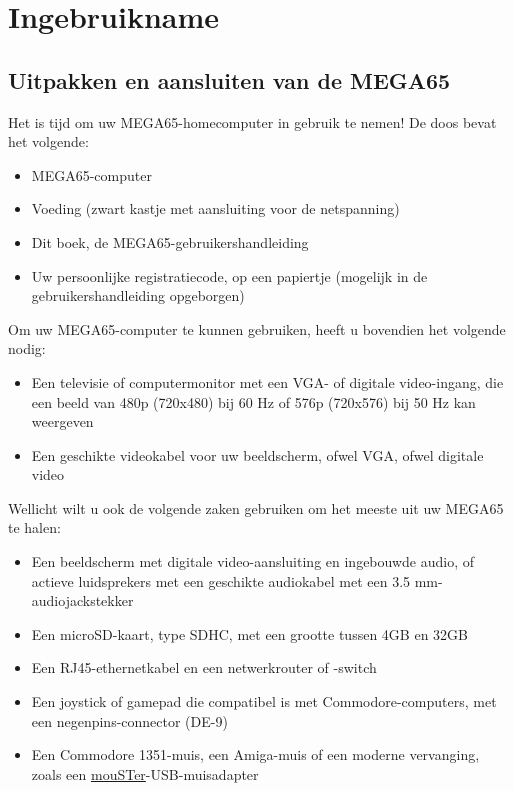 \chapter{Ingebruikname}

\section{Uitpakken en aansluiten van de MEGA65}
\label{cha:setup}

Het is tijd om uw MEGA65-homecomputer in gebruik te nemen! De doos bevat het volgende:

\begin{itemize}
\setlength\itemsep{-0.75mm}
	\item MEGA65-computer	\item Voeding (zwart kastje met aansluiting voor de netspanning)	\item Dit boek, de MEGA65-gebruikershandleiding	\item Uw persoonlijke registratiecode, op een papiertje (mogelijk in de gebruikershandleiding opgeborgen)
\end{itemize}

Om uw MEGA65-computer te kunnen gebruiken, heeft u bovendien het volgende nodig:

\begin{itemize}
	\item Een televisie of computermonitor met een VGA- of digitale video-ingang, die een beeld van 480p (720x480) bij 60 Hz of 576p (720x576) bij 50 Hz kan weergeven	\item Een geschikte videokabel voor uw beeldscherm, ofwel VGA, ofwel digitale video
\end{itemize}

Wellicht wilt u ook de volgende zaken gebruiken om het meeste uit uw MEGA65 te halen:

\begin{itemize}
	\item Een beeldscherm met digitale video-aansluiting en ingebouwde audio, of actieve luidsprekers met een geschikte audiokabel met een 3.5 mm-audiojackstekker	\item Een microSD-kaart, type SDHC, met een grootte tussen 4GB en 32GB	\item Een RJ45-ethernetkabel en een netwerkrouter of -switch	\item Een joystick of gamepad die compatibel is met Commodore-computers, met een negenpins-connector (DE-9)	\item Een Commodore 1351-muis, een Amiga-muis of een moderne vervanging, zoals een \href{https://retrohax.net/shop/amiga/mouster/}{mouSTer}-USB-muisadapter
\end{itemize}

